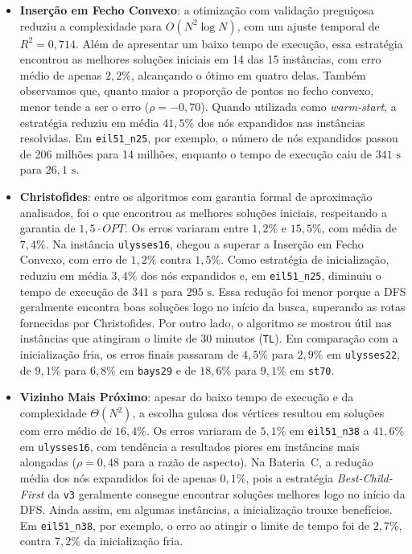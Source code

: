 \begin{itemize}
    \item \textbf{Inserção em Fecho Convexo}: a otimização com validação preguiçosa reduziu a complexidade para $O(N^2 \log N)$, com um ajuste temporal de $R^2 = 0{,}714$. Além de apresentar um baixo tempo de execução, essa estratégia encontrou as melhores soluções iniciais em 14 das 15 instâncias, com erro médio de apenas $2{,}2\%$, alcançando o ótimo em quatro delas. Também observamos que, quanto maior a proporção de pontos no fecho convexo, menor tende a ser o erro ($\rho = -0{,}70$). Quando utilizada como \textit{warm-start}, a estratégia reduziu em média $41{,}5\%$ dos nós expandidos nas instâncias resolvidas. Em \texttt{eil51\_n25}, por exemplo, o número de nós expandidos passou de 206 milhões para 14 milhões, enquanto o tempo de execução caiu de $341\text{ s}$ para $26{,}1\text{ s}$.

    \item \textbf{Christofides}: entre os algoritmos com garantia formal de aproximação analisados, foi o que encontrou as melhores soluções iniciais, respeitando a garantia de $1{,}5 \cdot OPT$. Os erros variaram entre $1{,}2\%$ e $15{,}5\%$, com média de $7{,}4\%$. Na instância \texttt{ulysses16}, chegou a superar a Inserção em Fecho Convexo, com erro de $1{,}2\%$ contra $1{,}5\%$. Como estratégia de inicialização, reduziu em média $3{,}4\%$ dos nós expandidos e, em \texttt{eil51\_n25}, diminuiu o tempo de execução de $341\text{ s}$ para $295\text{ s}$. Essa redução foi menor porque a DFS geralmente encontra boas soluções logo no início da busca, superando as rotas fornecidas por Christofides. Por outro lado, o algoritmo se mostrou útil nas instâncias que atingiram o limite de 30 minutos (\texttt{TL}). Em comparação com a inicialização fria, os erros finais passaram de $4{,}5\%$ para $2{,}9\%$ em \texttt{ulysses22}, de $9{,}1\%$ para $6{,}8\%$ em \texttt{bays29} e de $18{,}6\%$ para $9{,}1\%$ em \texttt{st70}.

    \item \textbf{Vizinho Mais Próximo}: apesar do baixo tempo de execução e da complexidade $\Theta(N^2)$, a escolha gulosa dos vértices resultou em soluções com erro médio de $16{,}4\%$. Os erros variaram de $5{,}1\%$ em \texttt{eil51\_n38} a $41{,}6\%$ em \texttt{ulysses16}, com tendência a resultados piores em instâncias mais alongadas ($\rho = 0{,}48$ para a razão de aspecto). Na Bateria~C, a redução média dos nós expandidos foi de apenas $0{,}1\%$, pois a estratégia \textit{Best-Child-First} da \texttt{v3} geralmente consegue encontrar soluções melhores logo no início da DFS. Ainda assim, em algumas instâncias, a inicialização trouxe benefícios. Em \texttt{eil51\_n38}, por exemplo, o erro ao atingir o limite de tempo foi de $2{,}7\%$, contra $7{,}2\%$ da inicialização fria.


\end{itemize}
